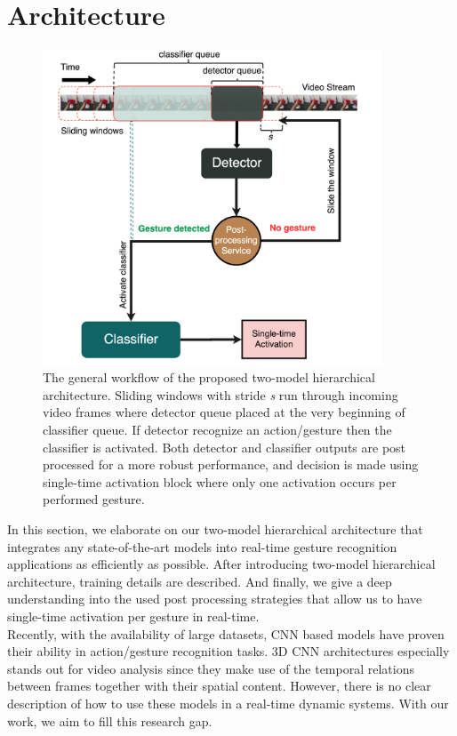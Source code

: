 \section{Architecture}
\label{sec:architecture}
\begin{figure}[h!] 
	\centering
	\includegraphics[width =0.9\textwidth]{figures/arch}
	\caption{The general workflow of the proposed two-model hierarchical architecture. Sliding windows with stride \textit{s} run through incoming video frames where detector queue placed at the very beginning of classifier queue. If detector recognize an action/gesture then the classifier is activated. Both detector and classifier outputs are post processed for a more robust performance, and decision is made using single-time activation block where only one activation occurs per performed gesture.}
	\label{fig:workflow}
\end{figure}

In this section, we elaborate on our two-model hierarchical architecture that integrates any state-of-the-art models into  real-time gesture recognition applications as efficiently as possible. After introducing two-model hierarchical architecture, training details are described. And finally, we give a deep understanding into the used post processing strategies that allow us to have single-time activation per gesture in real-time. \\

Recently, with the availability of large datasets, CNN based models have proven their ability in action/gesture recognition tasks. 3D CNN architectures especially stands out for video analysis since they make use of the temporal relations between frames together with their spatial content. However, there is no clear description of how to use these models in a real-time dynamic systems. With our work, we aim to fill this research gap.\\

